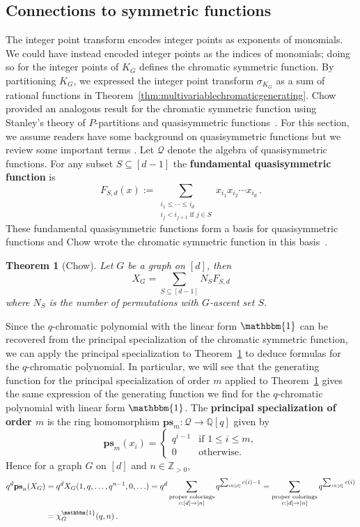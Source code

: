 \documentclass[11pt]{amsart}
\newtheorem{theorem}{Theorem}  [section] \numberwithin{equation}{section}
\newcommand\Def[1]{{\bf #1}}
\newcommand{\ps}{\textbf{ps}}
\begin{document}
\subsection{Connections to symmetric functions}\label{subsec:symmetricfunctions}
The integer point transform encodes integer points as exponents of monomials.
We could have instead encoded integer points as the indices of monomials; doing so for the integer points of
$K_G$ defines the chromatic symmetric function.
By partitioning $K_G$, we expressed the integer point transform $\sigma_{K_G}$ as a sum of rational functions in Theorem~\ref{thm:multivariablechromaticgenerating}.
Chow~\cite{chow1999} provided an analogous  result for the chromatic symmetric function using Stanley's  theory
of $P$-partitions and quasisymmetric functions~\cite{stanleychromatic}. 
For this section, we assume readers have some background on quasisymmetric functions but we review some important terms \cite[Section~7.19]{enumerativecombinatorics}.
Let $\mathcal{Q}$ denote the algebra of quasisymmetric functions.
For any subset $S \subseteq [d-1]$ the \Def{fundamental quasisymmetric function} is
\[
    F_{S,d}(x) := \sum_{\substack{{i_1 \leq \cdots \leq i_d} \\ i_j < i_{j+1} \text{ if } j \in S }} x_{i_1}
x_{i_2} \cdots x_{i_d} \, .
\]
These fundamental quasisymmetric functions form a basis for quasisymmetric functions and Chow wrote the
chromatic symmetric function in this basis~\cite[Corollary~1]{chow1999}.
\begin{theorem}[Chow]\label{thm:chowchromatic}
    Let $G$ be a graph on $[d]$, then
    \[
        X_G = \sum_{S \subseteq [d-1]} N_S F_{S,d}
    \]
    where $N_S$ is the number of permutations with $G$-ascent set $S$.
\end{theorem}
Since the $q$-chromatic polynomial with the linear form $\mathbbm{1}$ can be recovered from the principal specialization of the chromatic symmetric function, we can apply the principal specialization to Theorem~\ref{thm:chowchromatic} to deduce formulas for the $q$-chromatic polynomial.
In particular, we will see that the generating function for the principal specialization of order $m$ applied to Theorem~\ref{thm:chowchromatic} gives the same expression of the generating function we find for the $q$-chromatic polynomial with linear form $\mathbbm{1}$.
The \Def{principal specialization of order $m$} is the ring homomorphism $\ps_m: \mathcal{Q} \to \mathbb{Q}[q]$
given by
\[
    \ps_m(x_i) = \begin{cases}
        q^{i-1} & \text{if } 1 \leq i \leq m, \\
        0 & \text{otherwise.}
    \end{cases}
\]
Hence for a graph $G$ on $[d]$ and $n \in \mathbb{Z}_{>0}$,
\begin{align*}
    q^d \ps_n(X_G)
    &= q^d X_G(1,q,\ldots,q^{n-1},0,\ldots)
     = q^d \sum_{\substack{\text{proper colorings} \\ c:[d] \to [n]}} q^{\sum_{i \in [d]} c(i)-1}
     = \sum_{\substack{\text{proper colorings} \\ c:[d] \to [n]}} q^{\sum_{i \in [d]} c(i)} \\
    &= \chi_G^\mathbbm{1}(q,n) \, .
\end{align*}
\end{document}
